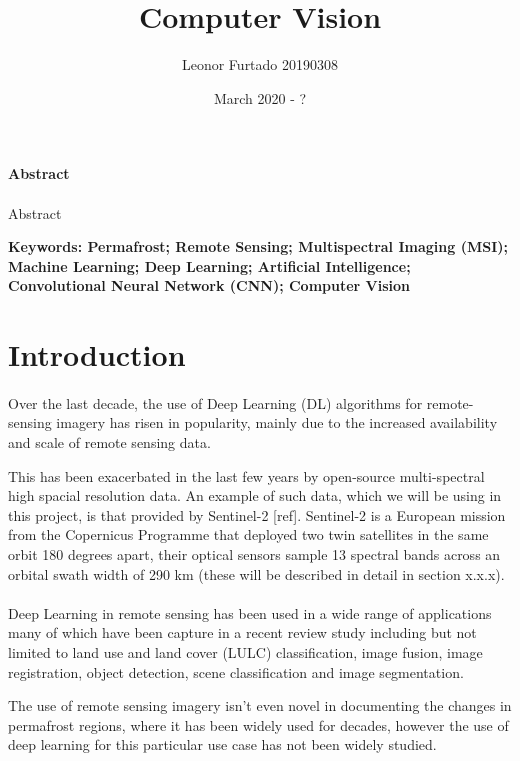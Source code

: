 \documentclass{article}
\title{Computer Vision}
\author{Leonor Furtado 20190308}
\date{March 2020 - ?}
\begin{document}
\maketitle
\paragraph{Abstract}
\paragraph{}
Abstract 

\textbf{Keywords: Permafrost; Remote Sensing; Multispectral Imaging (MSI); Machine Learning; Deep Learning; Artificial Intelligence; Convolutional Neural Network (CNN); Computer Vision}

\section{Introduction}

\paragraph{}
Over the last decade, the use of Deep Learning (DL) algorithms for remote-sensing imagery has risen in popularity, mainly due to the increased availability and scale of remote sensing data.

This has been exacerbated in the last few years by open-source multi-spectral high spacial resolution data. An example of such data, which we will be using in this project, is that provided by Sentinel-2 [ref]. Sentinel-2 is a European mission from the Copernicus Programme that deployed two twin satellites in the same orbit 180 degrees apart, their optical sensors sample 13 spectral bands across an orbital swath width of 290 km (these will be described in detail in section x.x.x).

\paragraph{}
Deep Learning in remote sensing has been used in a wide range of applications many of which have been capture in a recent review study including but not limited to land use and land cover (LULC) classification, image fusion, image registration, object detection, scene classification and image segmentation.\cite{MA2019166}

The use of remote sensing imagery isn't even novel in documenting the changes in permafrost regions, where it has been widely used for decades, however the use of deep learning for this particular use case has not been widely studied. 
\end{document}
